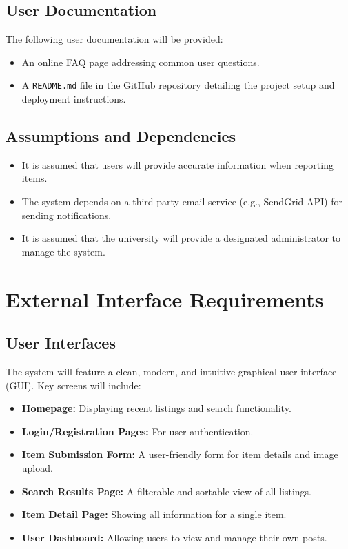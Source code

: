 \documentclass[11pt, a4paper]{article}
\begin{document}
\subsection{User Documentation}
The following user documentation will be provided:
\begin{itemize}
    \item An online FAQ page addressing common user questions.
    \item A \texttt{README.md} file in the GitHub repository detailing the project setup and deployment instructions.
\end{itemize}

\subsection{Assumptions and Dependencies}
\begin{itemize}
    \item It is assumed that users will provide accurate information when reporting items.
    \item The system depends on a third-party email service (e.g., SendGrid API) for sending notifications.
    \item It is assumed that the university will provide a designated administrator to manage the system.
\end{itemize}

\section{External Interface Requirements}

\subsection{User Interfaces}
The system will feature a clean, modern, and intuitive graphical user interface (GUI). Key screens will include:
\begin{itemize}
    \item \textbf{Homepage:} Displaying recent listings and search functionality.
    \item \textbf{Login/Registration Pages:} For user authentication.
    \item \textbf{Item Submission Form:} A user-friendly form for item details and image upload.
    \item \textbf{Search Results Page:} A filterable and sortable view of all listings.
    \item \textbf{Item Detail Page:} Showing all information for a single item.
    \item \textbf{User Dashboard:} Allowing users to view and manage their own posts.
\end{itemize}
\end{document}
